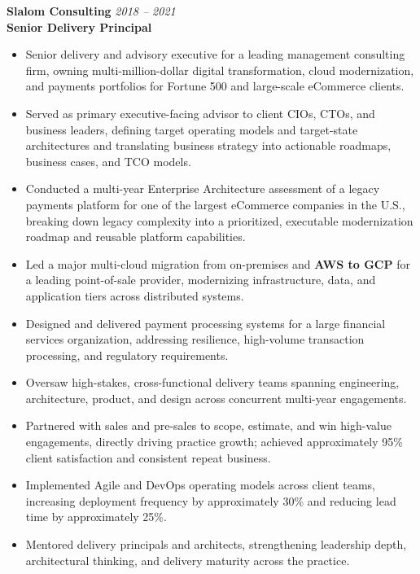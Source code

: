 \documentclass[11pt]{article}
\begin{document}
\vspace{6pt}

\textbf{Slalom Consulting} \hfill \textit{2018 -- 2021} \\
\textbf{Senior Delivery Principal}

\begin{itemize}
  \item Senior delivery and advisory executive for a leading management consulting firm, owning multi-million-dollar digital transformation, cloud modernization, and payments portfolios for Fortune 500 and large-scale eCommerce clients.
  \item Served as primary executive-facing advisor to client CIOs, CTOs, and business leaders, defining target operating models and target-state architectures and translating business strategy into actionable roadmaps, business cases, and TCO models.
  \item Conducted a multi-year Enterprise Architecture assessment of a legacy payments platform for one of the largest eCommerce companies in the U.S., breaking down legacy complexity into a prioritized, executable modernization roadmap and reusable platform capabilities.
  \item Led a major multi-cloud migration from on-premises and \textbf{AWS to GCP} for a leading point-of-sale provider, modernizing infrastructure, data, and application tiers across distributed systems.
  \item Designed and delivered payment processing systems for a large financial services organization, addressing resilience, high-volume transaction processing, and regulatory requirements.
  \item Oversaw high-stakes, cross-functional delivery teams spanning engineering, architecture, product, and design across concurrent multi-year engagements.
  \item Partnered with sales and pre-sales to scope, estimate, and win high-value engagements, directly driving practice growth; achieved approximately 95\% client satisfaction and consistent repeat business.
  \item Implemented Agile and DevOps operating models across client teams, increasing deployment frequency by approximately 30\% and reducing lead time by approximately 25\%.
  \item Mentored delivery principals and architects, strengthening leadership depth, architectural thinking, and delivery maturity across the practice.
\end{itemize}
\end{document}
